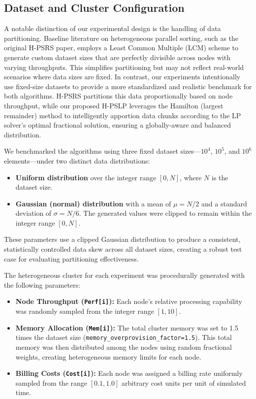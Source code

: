 \documentclass{article}
\begin{document}
\subsection{Dataset and Cluster Configuration}

A notable distinction of our experimental design is the handling of data partitioning. Baseline literature on heterogeneous parallel sorting, such as the original H-PSRS paper, employs a Least Common Multiple (LCM) scheme to generate custom dataset sizes that are perfectly divisible across nodes with varying throughputs. This simplifies partitioning but may not reflect real-world scenarios where data sizes are fixed. In contrast, our experiments intentionally use fixed-size datasets to provide a more standardized and realistic benchmark for both algorithms. H-PSRS partitions this data proportionally based on node throughput, while our proposed H-PSLP leverages the Hamilton (largest remainder) method to intelligently apportion data chunks according to the LP solver's optimal fractional solution, ensuring a globally-aware and balanced distribution.

We benchmarked the algorithms using three fixed dataset sizes---$10^4$, $10^5$, and $10^6$ elements---under two distinct data distributions:

\begin{itemize}
    \item \textbf{Uniform distribution} over the integer range $[0, N]$, where $N$ is the dataset size.
    \item \textbf{Gaussian (normal) distribution} with a mean of $\mu = N/2$ and a standard deviation of $\sigma = N/6$. The generated values were clipped to remain within the integer range $[0, N]$.
\end{itemize}

These parameters use a clipped Gaussian distribution to produce a consistent, statistically controlled data skew across all dataset sizes, creating a robust test case for evaluating partitioning effectiveness.

The heterogeneous cluster for each experiment was procedurally generated with the following parameters:

\begin{itemize}
    \item \textbf{Node Throughput (\texttt{Perf[i]}):} Each node's relative processing capability was randomly sampled from the integer range $[1, 10]$.
    \item \textbf{Memory Allocation (\texttt{Mem[i]}):} The total cluster memory was set to 1.5 times the dataset size (\texttt{memory\_overprovision\_factor=1.5}). This total memory was then distributed among the nodes using random fractional weights, creating heterogeneous memory limits for each node.
    \item \textbf{Billing Costs (\texttt{Cost[i]}):} Each node was assigned a billing rate uniformly sampled from the range $[0.1, 1.0]$ arbitrary cost units per unit of simulated time.
\end{itemize}
\end{document}
